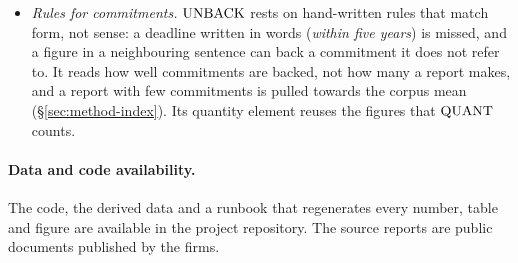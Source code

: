 \begin{itemize}
  non-financial narrative, and as a bounded ratio it ignores how many
  sentiment words a text contains. Some negative words of the dictionary
  name ESG topics (\emph{corruption}, \emph{injury}), so a report that covers
  them more reads as more negative, and in 2024 it misses a fall in positive
  narrative tone that two classifiers find (\S\ref{sec:robustness}).
\item \emph{Rules for commitments.} $\mathrm{UNBACK}$ rests on hand-written rules
  that match form, not sense: a deadline written in words (\emph{within five
  years}) is missed, and a figure in a neighbouring sentence can back a
  commitment it does not refer to. It reads how well commitments are backed,
  not how many a report makes, and a report with few commitments is pulled
  towards the corpus mean (\S\ref{sec:method-index}). Its quantity element
  reuses the figures that $\mathrm{QUANT}$ counts.
\end{itemize}

\paragraph{Data and code availability.} The code, the derived data and a
runbook that regenerates every number, table and figure are available in the
project repository. The source reports are public documents published by the
firms.
